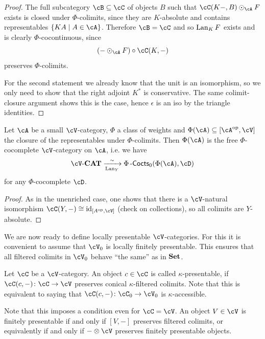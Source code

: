 \documentclass[a4paper,11pt,oneside,openany]{scrbook}
\begin{document}
\begin{proof}
	The full subcategory $ \cB \subseteq \cC $ of objects $ B $ such that $ \cC(K-,B)\odot _\cA F $ exists is closed under $ \Phi $-colimits, since they are $ K $-absolute and contains representables $ \{ KA \mid A \in \cA \} $.
	Therefore $ \cB = \cC $ and so $ \operatorname{Lan}_K F $ exists and is clearly $ \Phi $-cocontinuous, since
	\begin{displaymath}
		(- \odot _\cA F) \circ\cC(K,-)
	\end{displaymath}
	preserves $ \Phi $-colimits.

	For the second statement we already know that the unit is an isomorphism, so we only need to show that the right adjoint $ K^* $ is conservative.
	The same colimit-closure argument shows this is the case, hence $ \epsilon $ is an iso by the triangle identities.
\end{proof}
\begin{cor}
	Let $ \cA $ be a small $ \cV $-category, $ \Phi $ a class of weights and $ \Phi(\cA) \subseteq [\cA^{\op},\cV] $ the closure of the representables under $ \Phi $-colimits.
	Then $ \Phi(\cA) $ is the free $ \Phi $-cocomplete $ \cV $-category on $ \cA $, i.e. we have
	\begin{displaymath}
		\cV\text{-}\CAT \xrightarrow[\Lan_Y]{\sim} \Phi\Cocts_0(\Phi(\cA),\cD)
	\end{displaymath}
	for any $ \Phi $-cocomplete $ \cD $.
\end{cor}
\begin{proof}
	As in the unenriched case, one shows that there is a $ \cV $-natural
    isomorphism $ \cC(Y,-)\iso \id_{[A^{\op}, \cV]} $ (check on collections),
	so all colimits are $ Y $-absolute.
\end{proof}
We are now ready to define locally presentable $ \cV $-categories.
For this it is convenient to assume that $ \cV_0 $ is locally finitely presentable.
This ensures that all filtered colimits in $ \cV_0 $ behave ``the same'' as in $ {\normalfont\textbf{Set}} $.

\begin{defn}
	Let $ \cC $ be a $ \cV $-category.
	An object $ c \in \cC $ is called $ \kappa $-presentable, if $ \cC(c,-) \from \cC \to \cV $ preserves conical $ \kappa $-filtered colimits.
	Note that this is equivalent to saying that $ \cC (c,-)\from \cC_0 \to \cV_0 $ is $ \kappa $-accessible.
\end{defn}

Note that this imposes a condition even for $ \cC = \cV $.
An object $ V \in \cV $ is finitely presentable if and only if $ [V,-] $
preserves filtered colimits, or equivalently if and only if $ -\otimes \cV $
preserves finitely presentable objects.
\end{document}
